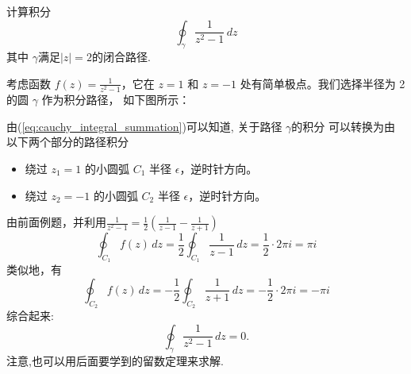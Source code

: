 \begin{example}
    计算积分 
    $$ 
    \oint_{\gamma} \frac{1}{z^2 - 1} \, dz  
    $$
    其中 $\gamma$满足$|z| = 2$的闭合路径.
\end{example}
\begin{solution}
    考虑函数 \( f(z) = \frac{1}{z^2 - 1} \)，它在 \( z = 1 \) 和 \( z = -1 \) 处有简单极点。我们选择半径为 2 的圆 \( \gamma \) 作为积分路径，
    如下图所示：

    \begin{center}
    \end{center}
    由(\ref{eq:cauchy_integral_summation})可以知道,
    关于路径 \( \gamma \)的积分
    可以转换为由以下两个部分的路径积分
    \begin{itemize}
        \item 绕过 \( z_1 = 1 \) 的小圆弧 \( C_1 \) 半径 \( \epsilon \)，逆时针方向。
        \item 绕过 \( z_2 = -1 \) 的小圆弧 \( C_2 \) 半径 \( \epsilon \)，逆时针方向。
    \end{itemize}
    由前面例题，并利用$\frac{1}{z^2 -1} = \frac{1}{2}\left( \frac{1}{z-1} - \frac{1}{z+1}\right)$
    \[
    \oint_{C_1} f(z) \, dz =\frac{1}{2}\oint_{C_1} \frac{1}{z-1} \, dz =  \frac{1}{2} \cdot 2\pi i  = \pi i
    \]
    类似地，有
    \[
        \oint_{C_2} f(z) \, dz =-\frac{1}{2}\oint_{C_2} \frac{1}{z+1} \, dz =  -\frac{1}{2} \cdot 2\pi i  = -\pi i
    \]
    综合起来:
    \[
        \oint_{\gamma} \frac{1}{z^2 - 1} \, dz = 0.
    \]
    注意,也可以用后面要学到的留数定理来求解.
\end{solution}

